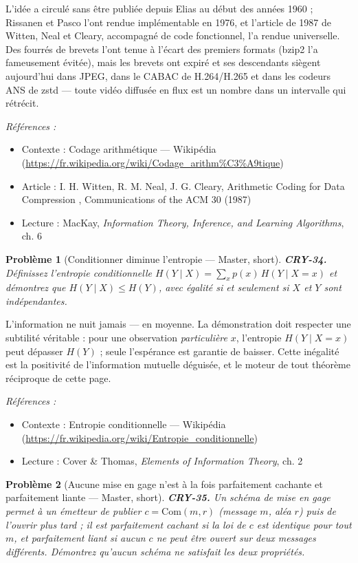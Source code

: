 \documentclass[11pt]{article}
\newtheorem{problem}{Problème}
\newenvironment{refs}{\par\small\noindent\emph{Références :}\begin{itemize}\setlength\itemsep{0pt}}{\end{itemize}\normalsize}
\begin{document}
\noindent L'idée a circulé sans être publiée depuis Elias au début des années 1960 ;
Rissanen et Pasco l'ont rendue implémentable en 1976, et l'article de 1987 de Witten, Neal et
Cleary, accompagné de code fonctionnel, l'a rendue universelle. Des fourrés de brevets l'ont
tenue à l'écart des premiers formats (bzip2 l'a fameusement évitée), mais les brevets ont
expiré et ses descendants siègent aujourd'hui dans JPEG, dans le CABAC de H.264/H.265 et dans
les codeurs ANS de zstd --- toute vidéo diffusée en flux est un nombre dans un intervalle qui
rétrécit.

\begin{refs}
\item Contexte : Codage arithmétique --- Wikipédia (\url{https://fr.wikipedia.org/wiki/Codage_arithm%C3%A9tique})
\item Article : I. H. Witten, R. M. Neal, J. G. Cleary, \og{} Arithmetic Coding for Data Compression \fg{}, Communications of the ACM 30 (1987)
\item Lecture : MacKay, \textit{Information Theory, Inference, and Learning Algorithms}, ch. 6
\end{refs}

\bigskip

\begin{problem}[{Conditionner diminue l'entropie --- Master, short}]
\textbf{CRY-34.} Définissez l'entropie conditionnelle
$H(Y \mid X) = \sum_x p(x)\, H(Y \mid X = x)$ et démontrez que
$H(Y \mid X) \le H(Y)$, avec égalité si et seulement si $X$ et $Y$ sont
indépendantes.
\end{problem}

\noindent \og{} L'information ne nuit jamais \fg{} --- en moyenne. La démonstration doit
respecter une subtilité véritable : pour une observation \textit{particulière} $x$, l'entropie
$H(Y \mid X = x)$ peut dépasser $H(Y)$ ; seule l'espérance est garantie de baisser. Cette
inégalité est la positivité de l'information mutuelle déguisée, et le moteur de tout théorème
réciproque de cette page.

\begin{refs}
\item Contexte : Entropie conditionnelle --- Wikipédia (\url{https://fr.wikipedia.org/wiki/Entropie_conditionnelle})
\item Lecture : Cover \& Thomas, \textit{Elements of Information Theory}, ch. 2
\end{refs}

\bigskip

\begin{problem}[{Aucune mise en gage n'est à la fois parfaitement cachante et parfaitement liante --- Master, short}]
\textbf{CRY-35.} Un schéma de mise en gage permet à un émetteur de publier
$c = \mathrm{Com}(m, r)$ (message $m$, aléa $r$) puis de l'ouvrir plus tard ; il est
\textit{parfaitement cachant} si la loi de $c$ est identique pour tout $m$, et
\textit{parfaitement liant} si aucun $c$ ne peut être ouvert sur deux messages différents.
Démontrez qu'aucun schéma ne satisfait les deux propriétés.
\end{problem}
\end{document}
